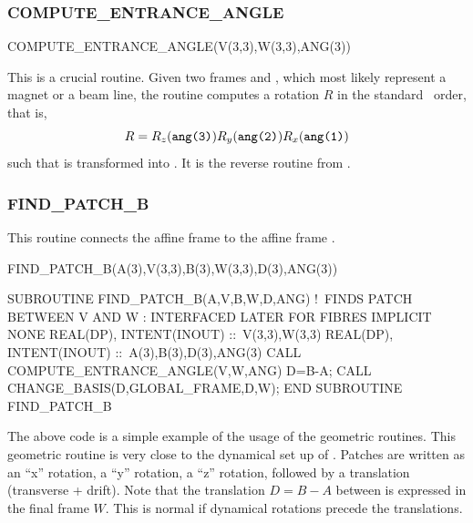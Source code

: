 \subsubsection{COMPUTE\_ENTRANCE\_ANGLE}

%
\begin{ptccode}
COMPUTE_ENTRANCE_ANGLE(V(3,3),W(3,3),ANG(3))
\end{ptccode}

%
This is a crucial routine. Given two frames  and , which most likely
represent a magnet or a beam line, the routine computes a rotation
$R$ in the standard \PTC\ order, that is,
\begin{equation*}
  R = R_z (\texttt{ang(3)}) R_y (\texttt{ang(2)}) R_x (\texttt{ang(1)})
\end{equation*}
such that  is transformed into . It is the reverse routine from .


\subsubsection{FIND\_PATCH\_B}

%
This routine connects the affine frame  to the affine frame .

\begin{ptccode}
FIND_PATCH_B(A(3),V(3,3),B(3),W(3,3),D(3),ANG(3))
\end{ptccode}

\begin{ptccode}
SUBROUTINE FIND_PATCH_B(A,V,B,W,D,ANG)
  !\ FINDS PATCH BETWEEN V AND W : INTERFACED LATER FOR FIBRES
  IMPLICIT NONE
  REAL(DP), INTENT(INOUT) ::\ V(3,3),W(3,3)
  REAL(DP), INTENT(INOUT) ::\ A(3),B(3),D(3),ANG(3)
  CALL COMPUTE_ENTRANCE_ANGLE(V,W,ANG)
  D=B-A; CALL CHANGE_BASIS(D,GLOBAL_FRAME,D,W);
END SUBROUTINE FIND_PATCH_B
\end{ptccode}

The above code is a simple example of the usage of the geometric routines.
This geometric routine is very close to the dynamical set up of \PTC. Patches
are written as an ``x'' rotation, a ``y'' rotation, a ``z'' rotation, followed by a
translation (transverse + drift). Note that the translation $D = B - A$ between
is expressed in the final frame $W$. This is normal if dynamical rotations
precede the translations.


